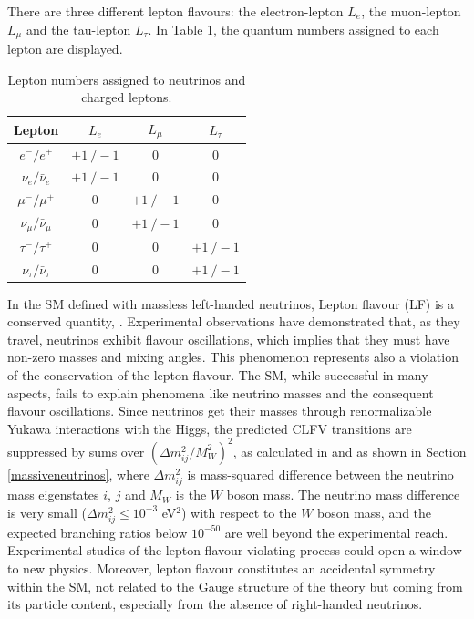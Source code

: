 There are three different lepton flavours: the electron-lepton $L_e$, 
the muon-lepton $L_{\mu}$ and the tau-lepton $L_{\tau}$. In Table 
\ref{tab:leptons}, the quantum numbers assigned to each lepton are displayed.
 \begin{center}  
\begin{table}[!h]
\centering
\renewcommand{\arraystretch}{1.5}
\begin{tabular}{c c c c}
\hline
Lepton & $L_e$ & $L_{\mu}$ & $L_{\tau}$\\
\hline
$e^-/e^+$ & $+1 \ /-1$ & 0 & 0 \\
$\nu_{e}/\bar{\nu}_{e}$ & $+1 \ /-1$ & 0 & 0 \\
$\mu^-/\mu^+$ & 0 & $+1 \ /-1$ & 0 \\
$\nu_{\mu}/\bar{\nu}_{\mu}$ & 0 & $+1 \ /-1$ & 0 \\
$\tau^-/\tau^+$ & 0 & 0 & $+1 \ /-1$\\
$\nu_{\tau}/\bar{\nu}_{\tau}$ & 0 & 0 & $+1 \ /-1$ \\
\hline
\end{tabular}
\caption{Lepton numbers assigned to neutrinos and charged leptons.}
\label{tab:leptons}
\end{table}
\end{center}
In the SM defined with massless 
left-handed neutrinos, Lepton flavour (LF) is a conserved quantity, 
\cite{universe8060299}. Experimental observations have 
demonstrated that, as they travel, neutrinos exhibit flavour 
oscillations, which implies that they must have non-zero masses 
and mixing angles. This phenomenon represents also a violation 
of the conservation of the lepton flavour. The SM, 
while successful in many aspects, fails to explain phenomena 
like neutrino masses and the consequent flavour oscillations. 
Since neutrinos get their masses through renormalizable Yukawa interactions
with the Higgs, the predicted CLFV transitions are suppressed 
by sums over $(\Delta m^2_{i j}/M^2 _W)^2$, as calculated in 
\cite{MARCIANO1977303} and as shown in Section 
\ref{massiveneutrinos}, where $\Delta m^2_{ij}$ is mass-squared 
difference between the neutrino mass eigenstates $i$, $j$ and 
$M_W$ is the $W$ boson mass. The neutrino mass difference is 
very small ($\Delta m^2 _{i j} \leq 10^{-3}$ eV$^2$) with respect to the $W$ boson mass,
and the expected branching ratios  
below $10^{-50}$ are well beyond the experimental reach. Experimental studies 
of the lepton flavour violating process could open a window to new physics. 
Moreover, lepton flavour constitutes an accidental symmetry within the SM, 
not related to the Gauge structure of the theory but coming
from its particle content, especially from the absence of right-handed neutrinos.

